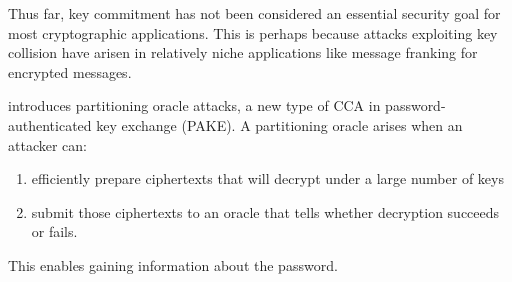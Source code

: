 Thus far, key commitment has not been considered an essential security goal for most cryptographic applications.
This is perhaps because attacks exploiting key collision have arisen in relatively niche applications like
message franking for encrypted messages.

\cite{grubs} introduces partitioning oracle attacks, a new type of CCA in password-authenticated key exchange (PAKE).
A partitioning oracle arises when an attacker can:
\begin{enumerate}
    \item efficiently prepare ciphertexts that will decrypt under a large number of keys
    \item submit those ciphertexts to an oracle that tells whether decryption succeeds or fails.
\end{enumerate}

This enables gaining information about the password.